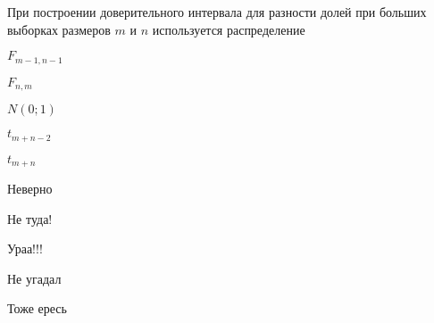 
\begin{question}
При построении доверительного интервала для разности долей при больших
выборках размеров \(m\) и \(n\) используется распределение
\begin{answerlist}
  \item \(F_{m-1, n-1}\)
  \item \(F_{n,m}\)
  \item \(N(0;1)\)
  \item \(t_{m+n-2}\)
  \item \(t_{m+n}\)
\end{answerlist}
\end{question}

\begin{solution}
\begin{answerlist}
  \item Неверно
  \item Не туда!
  \item Ураа!!!
  \item Не угадал
  \item Тоже ересь
\end{answerlist}
\end{solution}


